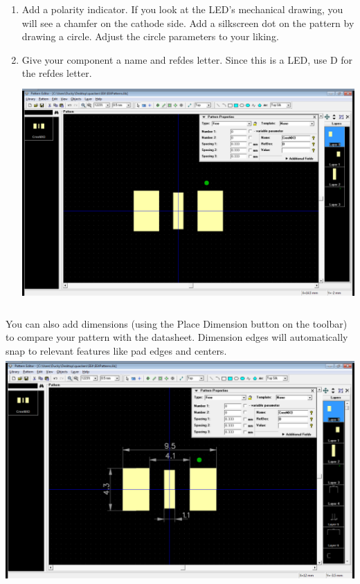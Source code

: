 \documentclass[letterpaper]{article}
\newcounter{saveenum}
\newcommand\liststyleRTFNumxi{%
\renewcommand\theenumi{\arabic{enumi}}
\renewcommand\theenumii{\alph{enumii}}
\renewcommand\theenumiii{\roman{enumiii}}
\renewcommand\theenumiv{\arabic{enumiv}}
\renewcommand\labelenumi{\theenumi.}
\renewcommand\labelenumii{\theenumii.}
\renewcommand\labelenumiii{\theenumiii.}
\renewcommand\labelenumiv{\theenumiv.}
}
\begin{document}
\liststyleRTFNumxi
\setcounter{saveenum}{\value{enumi}}
\begin{enumerate}
\setcounter{enumi}{\value{saveenum}}
\item {\sffamily\color[rgb]{0.30980393,0.5058824,0.7411765}
Add a polarity indicator. If you look at the LED's mechanical drawing, you will see a chamfer on the cathode side. Add a
silkscreen dot on the pattern by drawing a circle. Adjust the circle parameters to your liking.}
\item {\sffamily\color[rgb]{0.30980393,0.5058824,0.7411765}
Give your component a name and refdes letter. Since this is a LED, use D for the refdes letter.\newline
 \includegraphics[width=5.4in,height=3.3665in]{figures/ee4document-img040.png} }
\end{enumerate}
{\sffamily\color[rgb]{0.30980393,0.5058824,0.7411765}
You can also add dimensions (using the Place Dimension button on the toolbar) to compare your pattern with the
datasheet. Dimension edges will automatically snap to relevant features like pad edges and centers.\newline
 \includegraphics[width=5.4in,height=3.3665in]{figures/ee4document-img041.png} \newline
}
\end{document}

